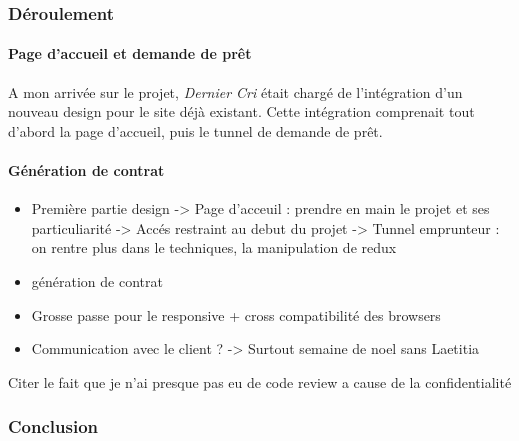 \bigskip

\subsubsection{Déroulement}\label{duxe9roulement-1}

\paragraph{Page d'accueil et demande de
prêt}\label{page-daccueil-et-demande-de-pruxeat}

\bigskip

A mon arrivée sur le projet, \emph{Dernier Cri} était chargé de
l'intégration d'un nouveau design pour le site déjà existant. Cette
intégration comprenait tout d'abord la page d'accueil, puis le tunnel de
demande de prêt.

\bigskip

\bigskip

\paragraph{Génération de contrat}\label{guxe9nuxe9ration-de-contrat}

\bigskip

\bigskip

\begin{itemize}
\item
  Première partie design -\textgreater{} Page d'acceuil : prendre en
  main le projet et ses particuliarité -\textgreater{} Accés restraint
  au debut du projet -\textgreater{} Tunnel emprunteur : on rentre plus
  dans le techniques, la manipulation de redux
\item
  génération de contrat
\item
  Grosse passe pour le responsive + cross compatibilité des browsers
\item
  Communication avec le client ? -\textgreater{} Surtout semaine de noel
  sans Laetitia
\end{itemize}

Citer le fait que je n'ai presque pas eu de code review a cause de la
confidentialité

\subsubsection{Conclusion}\label{conclusion-1}

\newpage

\newpage

